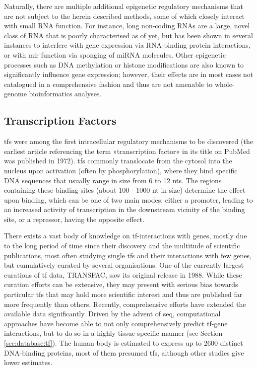 Naturally, there are multiple additional epigenetic regulatory mechanisms that are not subject to the herein described methods, some of which closely interact with small RNA function. For instance, long non-coding RNAs are a large, novel class of RNA that is poorly characterised as of yet, but has been shown in several instances to interfere with gene expression via RNA-binding protein interactions, or with \ac{mir} function via sponging of miRNA molecules. Other epigenetic processes such as DNA methylation or histone modifications are also known to significantly influence gene expression; however, their effects are in most cases not catalogued in a comprehensive fashion and thus are not amenable to whole-genome bioinformatics analyses.

\subsection{Transcription Factors} \label{sec:intro:tf}
\Acfp{tf} were among the first intracellular regulatory mechanisms to be discovered (the earliest article referencing the term »transcription factor« in its title on PubMed was published in 1972). \acp{tf} commonly translocate from the cytosol into the nucleus upon activation (often by phosphorylation), where they bind specific DNA sequences that usually range in size from 6 to 12 \acp{nt}. The regions containing these binding sites (about 100 - 1000 \ac{nt} in size) determine the effect upon binding, which can be one of two main modes: either a promoter, leading to an increased activity of transcription in the downstream vicinity of the binding site, or a repressor, having the opposite effect. 

There exists a vast body of knowledge on \ac{tf}-interactions with genes, mostly due to the long period of time since their discovery and the multitude of scientific publications, most often studying single \acp{tf} and their interactions with few genes, but cumulatively curated by several organisations. One of the currently largest curations of \ac{tf} data, TRANSFAC, saw its original release in 1988. While these curation efforts can be extensive, they may present with serious bias towards particular \acp{tf} that may hold more scientific interest and thus are published far more frequently than others. Recently, comprehensive efforts have extended the available data significantly. Driven by the advent of \ac{seq}, computational approaches have become able to not only comprehensively predict \ac{tf}-gene interactions, but to do so in a highly tissue-specific manner (see Section \ref{sec:database:tf}). The human body is estimated to express up to 2600 distinct DNA-binding proteins, most of them presumed \acp{tf},\cite{Babu2004} although other studies give lower estimates. 

